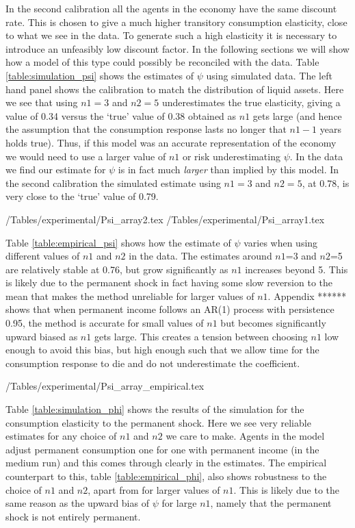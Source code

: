 
 In the second calibration all the agents in the economy have the same discount rate. This is chosen to give a much higher transitory consumption elasticity, close to what we see in the data. To generate such a high elasticity it is necessary to introduce an unfeasibly low discount factor. In the following sections we will show how a model of this type could possibly be reconciled with the data.
Table \ref{table:simulation_psi} shows the estimates of $\psi$ using simulated data. The left hand panel shows the calibration to match the distribution of liquid assets. Here we see that using $n1=3$ and $n2=5$ underestimates the true elasticity, giving a value of 0.34 versus the `true' value of 0.38 obtained as $n1$ gets large (and hence the assumption that the consumption response lasts no longer that $n1-1$ years holds true). Thus, if this model was an accurate representation of the economy we would need to use a larger value of $n1$ or risk underestimating $\psi$. In the data we find our estimate for $\psi$ is in fact much \textit{larger} than implied by this model. In the second calibration the simulated estimate using $n1=3$ and $n2=5$, at 0.78, is very close to the `true' value of 0.79.
\begin{center}
	\econtexRoot/Tables/experimental/Psi_array2.tex	\econtexRoot/Tables/experimental/Psi_array1.tex
	\label{table:simulation_psi}
\end{center}
Table \ref{table:empirical_psi} shows how the estimate of $\psi$ varies when using different values of $n1$ and $n2$ in the data. The estimates around $n1$=3 and $n2$=5 are relatively stable at 0.76, but grow significantly as $n1$ increases beyond 5. This is likely due to the permanent shock in fact having some slow reversion to the mean that makes the method unreliable for larger values of $n1$. Appendix ****** shows that when permanent income follows an AR(1) process with persistence 0.95, the method is accurate for small values of $n1$ but becomes significantly upward biased as $n1$ gets large. This creates a tension between choosing $n1$ low enough to avoid this bias, but high enough such that we allow time for the consumption response to die and do not underestimate the coefficient.
\begin{center}
	\econtexRoot/Tables/experimental/Psi_array_empirical.tex		
	\label{table:empirical_psi}
\end{center}
Table \ref{table:simulation_phi} shows the results of the simulation for the consumption elasticity to the permanent shock. Here we see very reliable estimates for any choice of $n1$ and $n2$ we care to make. Agents in the model adjust permanent consumption one for one with permanent income (in the medium run) and this comes through clearly in the estimates. The empirical counterpart to this, table \ref{table:empirical_phi}, also shows robustness to the choice of $n1$ and $n2$, apart from for larger values of $n1$. This is likely due to the same reason as the upward bias of $\psi$ for large $n1$, namely that the permanent shock is not entirely permanent.
